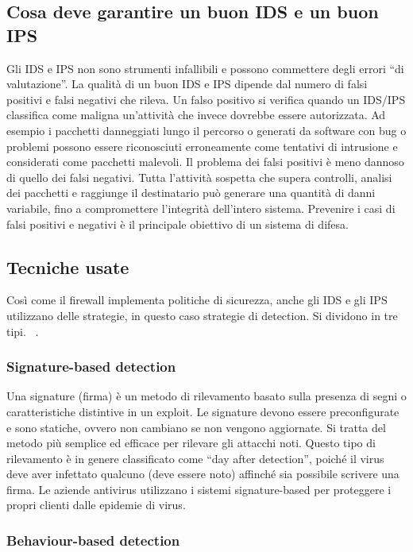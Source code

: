\subsection{Cosa deve garantire un buon IDS e un buon IPS}

Gli IDS e IPS non sono strumenti infallibili e possono commettere degli errori ``di valutazione''. La qualità di un buon IDS e IPS dipende dal numero di falsi positivi e falsi negativi che rileva. Un falso positivo si verifica quando un IDS/IPS classifica come maligna un'attività che invece dovrebbe essere autorizzata. Ad esempio i pacchetti danneggiati lungo il percorso o generati da software con bug o problemi possono essere riconosciuti erroneamente come tentativi di intrusione e considerati come pacchetti malevoli. Il problema dei falsi positivi è meno dannoso di quello dei falsi negativi. Tutta l'attività sospetta che supera controlli, analisi dei pacchetti e raggiunge il destinatario può generare una quantità di danni variabile, fino a compromettere l'integrità dell'intero sistema. Prevenire i casi di falsi positivi e negativi è il principale obiettivo di un sistema di difesa.

\subsection{Tecniche usate}

Così come il firewall implementa politiche di sicurezza, anche gli IDS e gli IPS utilizzano delle strategie, in questo caso strategie di detection. Si dividono in tre tipi.  ~\cite{cybersecurity360}.

\subsubsection{Signature-based detection}

Una signature (firma) è un metodo di rilevamento basato sulla presenza di segni o caratteristiche distintive in un exploit. Le signature devono essere preconfigurate e sono statiche, ovvero non cambiano se non vengono aggiornate. Si tratta del metodo più semplice ed efficace per rilevare gli attacchi noti. Questo tipo di rilevamento è in genere classificato come ``day after detection'', poiché il virus deve aver infettato qualcuno (deve essere noto) affinché sia possibile scrivere una firma. Le aziende antivirus utilizzano i sistemi signature-based per proteggere i propri clienti dalle epidemie di virus.

\subsubsection{Behaviour-based detection}

